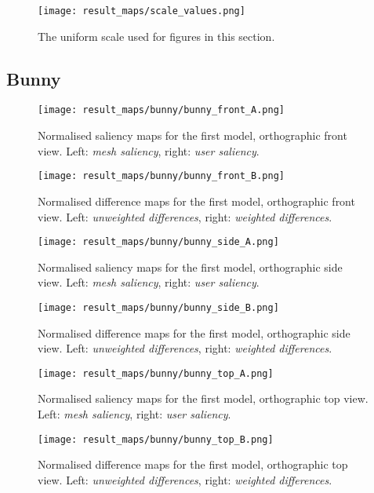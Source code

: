 \begin{figure}[htb]
	\centering
	\texttt{[image: result\_maps/scale\_values.png]}\\ %
	\caption{The uniform scale used for figures in this section.}
	\label{fig:results_scale}
\end{figure}


		\subsection{Bunny}
		\label{sec:results_bunny}
%
%
\begin{figure}[htb]
	\centering
	\texttt{[image: result\_maps/bunny/bunny\_front\_A.png]}\\ %
	\caption{Normalised saliency maps for the first model, orthographic front view. Left: \textit{mesh saliency}, right: \textit{user saliency}.}
	\label{fig:results_bunny_front_a}
\end{figure}
\begin{figure}[htb]
	\centering
	\texttt{[image: result\_maps/bunny/bunny\_front\_B.png]}\\ %
	\caption{Normalised difference maps for the first model, orthographic front view. Left: \textit{unweighted differences}, right: \textit{weighted differences}.}
	\label{fig:results_bunny_front_b}
\end{figure}

\begin{figure}[htb]
	\centering
	\texttt{[image: result\_maps/bunny/bunny\_side\_A.png]}\\ %
	\caption{Normalised saliency maps for the first model, orthographic side view. Left: \textit{mesh saliency}, right: \textit{user saliency}.}
	\label{fig:results_bunny_side_a}
\end{figure}
\begin{figure}[htb]
	\centering
	\texttt{[image: result\_maps/bunny/bunny\_side\_B.png]}\\ %
	\caption{Normalised difference maps for the first model, orthographic side view. Left: \textit{unweighted differences}, right: \textit{weighted differences}.}
	\label{fig:results_bunny_side_b}
\end{figure}

\begin{figure}[htb]
	\centering
	\texttt{[image: result\_maps/bunny/bunny\_top\_A.png]}\\ %
	\caption{Normalised saliency maps for the first model, orthographic top view. Left: \textit{mesh saliency}, right: \textit{user saliency}.}
	\label{fig:results_bunny_top_a}
\end{figure}
\begin{figure}[htb]
	\centering
	\texttt{[image: result\_maps/bunny/bunny\_top\_B.png]}\\ %
	\caption{Normalised difference maps for the first model, orthographic top view. Left: \textit{unweighted differences}, right: \textit{weighted differences}.}
	\label{fig:results_bunny_top_b}
\end{figure}

